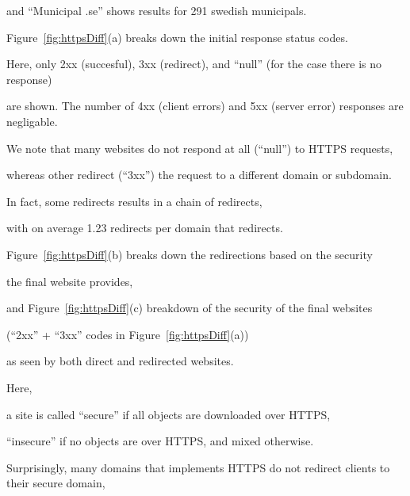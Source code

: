 \documentclass{sig-alternate-10pt}
\begin{document}
and ``Municipal .se'' shows results for 291 swedish municipals.


Figure~\ref{fig:httpsDiff}(a) breaks down the initial response status codes.

Here, only 2xx (succesful), 3xx (redirect), and ``null'' (for the case there is no response)

are shown.  The number of 4xx (client errors) and 5xx (server error) responses are negligable. 

We note that many websites do not respond at all (``null'') to HTTPS requests,

whereas other redirect (``3xx'') the request to a different domain or subdomain.


In fact, some redirects results in a chain of redirects,

with on average 1.23 redirects per domain that redirects.




Figure~\ref{fig:httpsDiff}(b) breaks down the redirections based on the security

the final website provides, 

and Figure~\ref{fig:httpsDiff}(c) breakdown of the security of the final websites 

(``2xx'' + ``3xx'' codes in Figure~\ref{fig:httpsDiff}(a))

as seen by both direct and redirected websites.

Here, 




a site is called ``secure'' if all objects are downloaded over HTTPS,

``insecure'' if no objects are over HTTPS, and mixed otherwise.



Surprisingly, many domains that implements HTTPS do not redirect clients to their secure domain,
\end{document}
